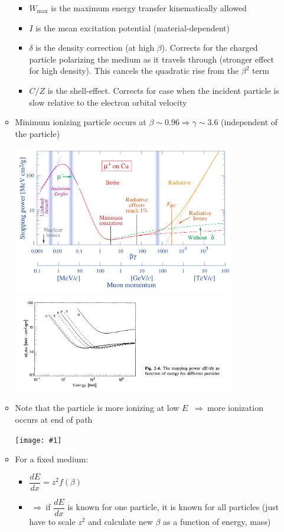 \documentclass[11pt]{article}
\newcommand{\dd}[2]{\dfrac{d #1}{d #2}}
\newcommand{\thus}{$~\Rightarrow~$}
\newcommand{\embedimgw}[2]{\begin{center}\texttt{[image: \#1]}\end{center}}
\begin{document}
\begin{itemize}
\begin{itemize}
\begin{itemize}
      \item $W_\text{max}$ is the maximum energy transfer kinematically allowed
      \item $I$ is the mean excitation potential (material-dependent)
      \item $\delta$ is the density correction (at high $\beta$). Corrects for the charged particle polarizing the medium as it travels through (stronger effect for high density). This cancels the quadratic rise from the $\beta^2$ term
      \item $C/Z$ is the shell-effect. Corrects for case when the incident particle is slow relative to the electron orbital velocity
    \end{itemize}
    \item Minimum ionizing particle occurs at $\beta \sim 0.96 \Rightarrow \gamma \sim 3.6$ (independent of the particle)
    \begin{center}
      \includegraphics[width=0.8\textwidth]{figs/dEdx_bbPDG.png}
      \includegraphics[width=0.8\textwidth]{figs/dEdx_bethebloch.png}
    \end{center}
    \item Note that the particle is more ionizing at low $E$ \thus more ionization occurs at end of path
    \embedimgw{figs/dEdx_bragg.png}{0.8}
    \item For a fixed medium:
    \begin{itemize}
      \item $\dd{E}{x} = z^2 f(\beta)$
      \item \thus if $\dd{E}{x}$ is known for one particle, it is known for all particles (just have to scale $z^2$ and calculate new $\beta$ as a function of energy, mass)
    \end{itemize}
  \end{itemize}
\end{itemize}
\end{document}
